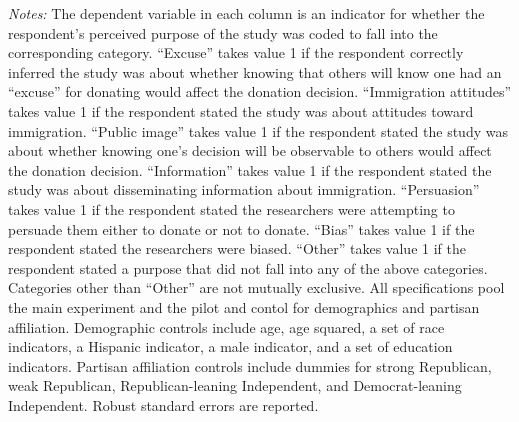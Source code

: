 \begin{table}[!htbp]
\begin{threeparttable}
\begin{tablenotes}
\item \textit{Notes:} The dependent variable in each column is an indicator for whether the respondent's perceived purpose of the study was coded to fall into the corresponding category. ``Excuse'' takes value 1 if the respondent correctly inferred the study was about whether knowing that others will know one had an ``excuse'' for donating would affect the donation decision. ``Immigration attitudes'' takes value 1 if the respondent stated the study was about attitudes toward immigration. ``Public image'' takes value 1 if the respondent stated the study was about whether knowing one's decision will be observable to others would affect the donation decision. ``Information'' takes value 1 if the respondent stated the study was about disseminating information about immigration. ``Persuasion'' takes value 1 if the respondent stated the researchers were attempting to persuade them either to donate or not to donate. ``Bias'' takes value 1 if the respondent stated the researchers were biased. ``Other'' takes value 1 if the respondent stated a purpose that did not fall into any of the above categories. Categories other than ``Other'' are not mutually exclusive. All specifications pool the main experiment and the pilot and contol for demographics and partisan affiliation. Demographic controls include age, age squared, a set of race indicators, a Hispanic indicator, a male indicator, and a set of education indicators. Partisan affiliation controls include dummies for strong Republican, weak Republican, Republican-leaning Independent, and Democrat-leaning Independent. Robust standard errors are reported.
\end{tablenotes}
\end{threeparttable}
\end{table} 
